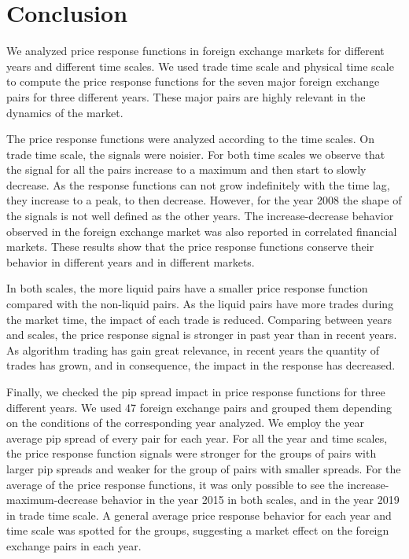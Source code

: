 \section{Conclusion}\label{sec:conclusion}

We analyzed price response functions in foreign exchange markets for different
years and different time scales. We used trade time scale and physical time
scale to compute the price response functions for the seven major foreign
exchange pairs for three different years. These major pairs are highly relevant
in the dynamics of the market.

The price response functions were analyzed according to the time scales. On
trade time scale, the signals were noisier. For both time scales we observe
that the signal for all the pairs increase to a maximum and then start to
slowly decrease. As the response functions can not grow indefinitely with the
time lag, they increase to a peak, to then decrease. However, for the year 2008
the shape of the signals is not well defined as the other years. The
increase-decrease behavior observed in the foreign exchange market was also
reported in correlated financial markets. These results show that the price
response functions conserve their behavior in different years and in different
markets.

In both scales, the more liquid pairs have a smaller price response function
compared with the non-liquid pairs. As the liquid pairs have more trades during
the market time, the impact of each trade is reduced. Comparing between years
and scales, the price response signal is stronger in past year than in recent
years. As algorithm trading has gain great relevance, in recent years the
quantity of trades has grown, and in consequence, the impact in the response
has decreased.

Finally, we checked the pip spread impact in price response functions for three
different years. We used 47 foreign exchange pairs and grouped them depending
on the conditions of the corresponding year analyzed. We employ the year
average pip spread of every pair for each year. For all the year and time
scales, the price response function signals were stronger for the groups of
pairs with larger pip spreads and weaker for the group of pairs with smaller
spreads. For the average of the price response functions, it was only possible
to see the increase-maximum-decrease behavior in the year 2015 in both scales,
and in the year 2019 in trade time scale. A general average price response
behavior for each year and time scale was spotted for the groups, suggesting a
market effect on the foreign exchange pairs in each year.
